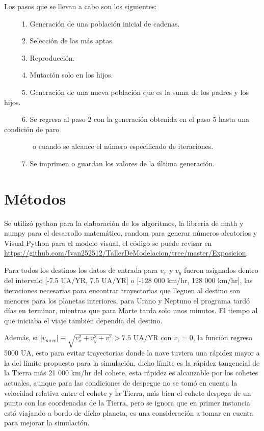 \documentclass[12pt,letterpaper]{article}
\begin{document}
Los pasos que se llevan a cabo son los siguientes:

\ \ \ \ \ 1. Generación de una población inicial de cadenas.

\ \ \ \ \ 2. Selección de las más aptas.

\ \ \ \ \ 3. Reproducción.

\ \ \ \ \ 4. Mutación solo en los hijos.

\ \ \ \ \ 5. Generación de una nueva población que es la suma de los padres y los hijos.

\ \ \ \ \ 6. Se regresa al paso 2 con la generación obtenida en el paso 5 hasta una condición de paro 

\ \ \ \ \ \ \ \ o cuando se alcance el número especificado de iteraciones.

\ \ \ \ \ 7. Se imprimen o guardan los valores de la última generación.

\section*{Métodos}

Se utilizó python para la elaboración de los algoritmos, la libreria de math y numpy para el desarrollo matemático, random para generar números aleatorios y Visual Python para el modelo visual, el código se puede revisar en \url{https://github.com/Ivan252512/TallerDeModelacion/tree/master/Exposicion}.

Para todos los destinos los datos de entrada para $v_x$ y $v_y$ fueron asignados dentro del intervalo [-7.5 UA/YR, 7.5 UA/YR] o [-128 000 km/hr, 128 000 km/hr], las iteraciones necesarias para encontrar trayectorias que lleguen al destino son menores  para los planetas interiores, para Urano y Neptuno el programa tardó días en terminar, mientras que para Marte tarda solo unos minutos. El tiempo al que iniciaba el viaje también dependía del destino.

Además, si $|v_{nave}|\equiv \sqrt{v_x^2+v_y^2+v_z^2}>7.5$ UA/YR con $v_z=0$, la función regresa 5000 UA, esto para evitar trayectorias donde la nave tuviera una rápidez mayor a la del límite propuesto para la simulación, dicho límite 
es la rápidez tangencial de la Tierra más 21 000 km/hr del cohete, esta rápidez es alcanzable por los cohetes actuales, aunque para las condiciones de despegue no se tomó en cuenta la velocidad relativa entre el cohete y la Tierra, más bien el cohete despega de un punto con las coordenadas de la Tierra, pero se ignora que en primer instancia está viajando a bordo de dicho planeta, es una consideración a tomar en cuenta para mejorar la simulación.
\end{document}
